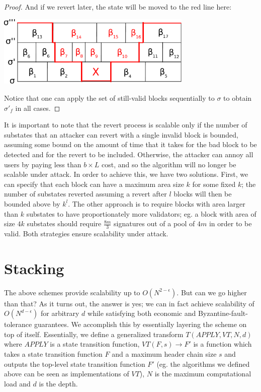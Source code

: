 \documentclass[11pt,a4paper]{report}
\theoremstyle{plain}
\theoremstyle{definition}
\theoremstyle{remark}
\begin{document}
\begin{proof}
And if we revert later, the state will be moved to the red line here:

\begin{center}
\includegraphics[width=0.7\textwidth]{figs/pdfs/revert3.pdf}
\end{center}

Notice that one can apply the set of still-valid blocks sequentially to $\sigma$ to obtain $\sigma'_f$ in all cases.
\end{proof}

It is important to note that the revert process is scalable only if the number of substates that an attacker can revert with a single invalid block is bounded, assuming some bound on the amount of time that it takes for the bad block to be detected and for the revert to be included. Otherwise, the attacker can annoy all users by paying less than $b \times  L$ cost, and so the algorithm will no longer be scalable under attack. In order to achieve this, we have two solutions. First, we can specify that each block can have a maximum area size $k$ for some fixed $k$; the number of substates reverted assuming a revert after $l$ blocks will then be bounded above by $k^l$. The other approach is to require blocks with area larger than $k$ substates to have proportionately more validators; eg. a block with area of size $4k$ substates should require $\frac{8m}{3}$ signatures out of a pool of $4m$ in order to be valid. Both strategies ensure scalability under attack.

\chapter{Stacking}

The above schemes provide scalability up to $O(N^{2-\epsilon})$. But can we go higher than that? As it turns out, the answer is yes; we can in fact achieve scalability of $O(N^{d-\epsilon})$ for arbitrary $d$ while satisfying both economic and Byzantine-fault-tolerance guarantees. We accomplish this by essentially layering the scheme on top of itself. Essentially, we define a generalized transform $T(APPLY, VT, N, d)$ where $APPLY$ is a state transition function, $VT(F, s) \rightarrow F'$ is a function which takes a state transition function $F$ and a maximum header chain size $s$ and outputs the top-level state transition function $F'$ (eg. the algorithms we defined above can be seen as implementations of $VT$), $N$ is the maximum computational load and $d$ is the depth.
\end{document}
